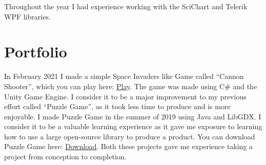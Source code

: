 \documentclass[]{twentysecondcv}
\begin{document}
Throughout the year I had experience working with the SciChart and Telerik WPF libraries. 
\section{Portfolio}
In February 2021 I made a simple Space Invaders like Game called ``Cannon Shooter'', which you can play here: \href{https://johnmckane.github.io/CannonShooter/htmlBuild/index.html}{Play}. The game was made using C\# and the Unity Game Engine. I consider it to be a major improvement to my previous effort called ``Puzzle Game'', as it took less time to produce and is more enjoyable.
I made Puzzle Game in the summer of 2019 using Java and LibGDX. I consider it to be a valuable learning experience as it gave me exposure to learning how to use a large open-source library to produce a product.
You can download Puzzle Game here: \href{https://johnmckane.github.io/PuzzleGame/index.html}{Download}.
Both these projects gave me experience taking a project from conception to completion.
\end{document}
